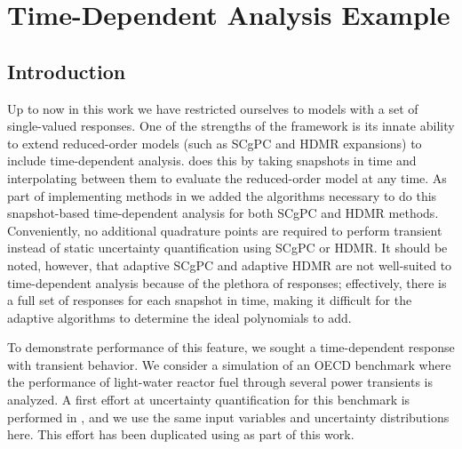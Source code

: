 
\chapter{Time-Dependent Analysis Example} %

\label{ch:timedep} %



\section{Introduction}
Up to now in this work we have restricted ourselves to models with a set of single-valued responses.  One of the strengths
of the \raven{} \cite{OECDraven} framework is its innate ability to extend reduced-order models (such as 
SCgPC and HDMR expansions) to
include time-dependent analysis.  \raven{} does this by taking snapshots in time and interpolating between them to evaluate
the reduced-order model at any time.  As part of implementing methods in \raven{} we added the algorithms necessary to do 
this snapshot-based
time-dependent analysis for both SCgPC and HDMR methods. 
Conveniently, no additional quadrature points are required to perform transient instead of static
uncertainty quantification using SCgPC or HDMR.  It should be noted, however, that adaptive SCgPC and adaptive
HDMR are not well-suited to time-dependent analysis because of the plethora of responses; effectively, there is a
full set of responses for each snapshot in time, making it difficult for the adaptive algorithms to determine the
ideal polynomials to add.

To demonstrate performance of this feature, we sought a time-dependent response with transient behavior.
We consider a  \bison{} \cite{OECDbison} simulation of an OECD benchmark \cite{OECDbenchmark} where the 
performance of light-water reactor fuel 
through several power transients is analyzed.  A first effort at uncertainty quantification for this benchmark
is performed in \cite{OECDdakota}, and we use the same input variables and uncertainty distributions here.
This effort has been duplicated using \raven{} \cite{ans2016winter} as part of this work.

